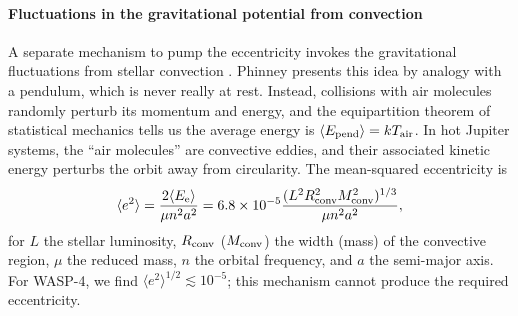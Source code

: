 \documentclass[12pt,twocolumn,tighten]{aastex62}
\begin{document}
\paragraph{Fluctuations in the gravitational potential from convection}
A separate mechanism to pump the eccentricity invokes the
gravitational fluctuations from stellar convection \citep[][Section
7]{phinney_pulsars_1992}.  Phinney presents this idea by analogy with
a pendulum, which is never really at rest. Instead, collisions with
air molecules randomly perturb its momentum and energy, and the
equipartition theorem of statistical mechanics tells us the average
energy is $\langle E_{\rm pend} \rangle = k T_{\rm air}$.  In hot
Jupiter systems, the ``air molecules'' are convective eddies, and
their associated kinetic energy perturbs the orbit away from
circularity.  The mean-squared eccentricity is \citep[][Equation
7.33]{phinney_pulsars_1992}
\begin{equation}
  \langle e^2 \rangle =
  \frac{ 2 \langle E_{\rm e} \rangle }{\mu n^2 a^2}
  = 6.8\times10^{-5}
  \frac{(L^2 R_{\rm conv}^2 M_{\rm conv}^2)^{1/3}}{\mu n^2 a^2},
\end{equation}
for $L$ the stellar luminosity, $R_{\rm conv}$ ($M_{\rm conv}$) the
width (mass) of the convective region,  $\mu$ the reduced mass, $n$
the orbital frequency, and $a$ the semi-major axis.  For WASP-4, we
find $\langle e^2 \rangle^{1/2} \lesssim 10^{-5}$; this mechanism
cannot produce the required eccentricity.

\end{document}
